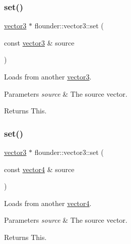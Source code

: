 \subsubsection{\texorpdfstring{set()}{set()}\hspace{0.1cm}{\footnotesize\ttfamily [2/3]}}
{\footnotesize\ttfamily \hyperlink{classflounder_1_1vector3}{vector3} $\ast$ flounder\+::vector3\+::set (\begin{DoxyParamCaption}\item[{const \hyperlink{classflounder_1_1vector3}{vector3} \&}]{source }\end{DoxyParamCaption})}



Loads from another \hyperlink{classflounder_1_1vector3}{vector3}. 


\begin{DoxyParams}{Parameters}
{\em source} & The source vector. \\
\hline
\end{DoxyParams}
\begin{DoxyReturn}{Returns}
This. 
\end{DoxyReturn}
\mbox{\label{classflounder_1_1vector3_a7a6d2d66bcd15ab4c71e42853db3c49d}} 
\subsubsection{\texorpdfstring{set()}{set()}\hspace{0.1cm}{\footnotesize\ttfamily [3/3]}}
{\footnotesize\ttfamily \hyperlink{classflounder_1_1vector3}{vector3} $\ast$ flounder\+::vector3\+::set (\begin{DoxyParamCaption}\item[{const \hyperlink{classflounder_1_1vector4}{vector4} \&}]{source }\end{DoxyParamCaption})}



Loads from another \hyperlink{classflounder_1_1vector4}{vector4}. 


\begin{DoxyParams}{Parameters}
{\em source} & The source vector. \\
\hline
\end{DoxyParams}
\begin{DoxyReturn}{Returns}
This. 
\end{DoxyReturn}
\mbox{\label{classflounder_1_1vector3_ad9f3c604d2f5956b22b9a1e636bfbd48}} 
